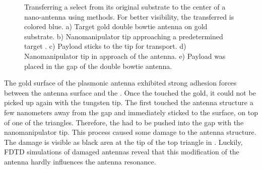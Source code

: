 \begin{figure}[!htb]
\begin{subfigure}{ 0.49\linewidth}
				\end{subfigure}
				\hfill
				\begin{subfigure}{ 0.49\linewidth}
					\centering
					\caption{}
					\label{subfig::pp_payload_delivered}
				\end{subfigure}
				\caption[Pick-and-place of \nd to antenna]{Transferring a select \nd from its original substrate to the center of a nano-antenna using \pp methods. For better visibility, the transferred \nds is colored blue. a) Target gold double bowtie antenna on gold substrate. b) Nanomanipulator tip approaching a predetermined target \nd. c) Payload \nd sticks to the tip for transport. d) Nanomanipulator tip in approach of the antenna. e) Payload \nd was placed in the gap of the double bowtie antenna.}
				\label{fig::pp_antenna}
			\end{figure}

			\FloatBarrier

			The gold surface of the plasmonic antenna exhibited strong adhesion forces between the antenna surface and the \nd.
			Once the \nd touched the gold, it could not be picked up again with the tungsten tip.
			The \nd first touched the antenna structure a few nanometers away from the gap and immediately sticked to the surface, on top of one of the triangles.
			Therefore, the \nd had to be pushed into the gap with the nanomanipulator tip.
			This process caused some damage to the antenna structure.
			The damage is visible as black area at the tip of the top triangle in .
			Luckily, FDTD simulations of damaged antennas reveal that this modification of the antenna hardly influences the antenna resonance.

